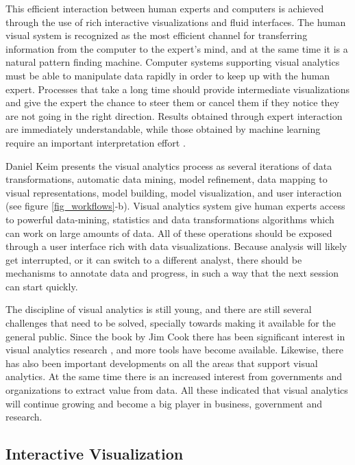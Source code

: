 This efficient interaction between human experts and computers is achieved through the use of rich interactive visualizations and fluid interfaces. The human visual system is recognized as the most efficient channel for transferring information from the computer to the expert's mind, and at the same time it is a natural pattern finding machine. Computer systems supporting visual analytics must be able to manipulate data rapidly in order to keep up with the human expert. Processes that take a long time should provide intermediate visualizations and give the expert the chance to steer them or cancel them if they notice they are not going in the right direction. Results obtained through expert interaction are immediately understandable, while those obtained by machine learning require an important interpretation effort \autocite{stahl_overview_2013}.

Daniel Keim presents the visual analytics process as several iterations of data transformations, automatic data mining, model refinement, data mapping to visual representations, model building, model visualization, and user interaction \autocite{keim_mastering_2010} (see figure \ref{fig_workflows}-b). Visual analytics system give human experts access to powerful data-mining, statistics and data transformations algorithms which can work on large amounts of data. All of these operations should be exposed through a user interface rich with data visualizations. Because analysis will likely get interrupted, or it can switch to a different analyst, there should be mechanisms to annotate data and progress, in such a way that the next session can start quickly. 


The discipline of visual analytics is still young, and there are still several challenges that need to be solved, specially towards making it available for the general public\autocite{kwon_visual_2011}. Since the book by Jim Cook there has been significant interest in visual analytics research \autocite{chen_illuminated_2012}, and more tools have become available. Likewise, there has also been important developments on all the areas that support visual analytics. At the same time there is an increased interest from governments and organizations to extract value from data. All these indicated that visual analytics will continue growing and become a big player in business, government and research.


\subsection{Interactive Visualization}

